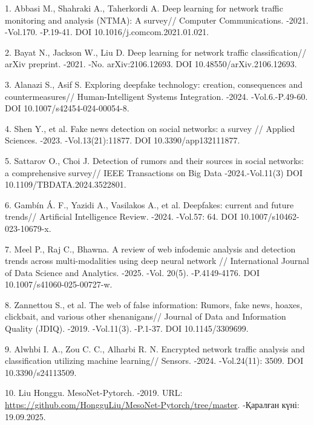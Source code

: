 \begin{refs}
1. Abbasi M., Shahraki A., Taherkordi A. Deep learning for network
traffic monitoring and analysis (NTMA): A survey// Computer
Communications. -2021. -Vol.170. -P.19-41. DOI
10.1016/j.comcom.2021.01.021.

2. Bayat N., Jackson W., Liu D. Deep learning for network traffic
classification// arXiv preprint. -2021. -No. arXiv:2106.12693. DOI
10.48550/arXiv.2106.12693.

3. Alanazi S., Asif S. Exploring deepfake technology: creation,
consequences and countermeasures// Human-Intelligent Systems
Integration. -2024. -Vol.6.-P.49-60. DOI 10.1007/s42454-024-00054-8.

4. Shen Y., et al. Fake news detection on social networks: a survey //
Applied Sciences. -2023. -Vol.13(21):11877. DOI 10.3390/app132111877.

5. Sattarov O., Choi J. Detection of rumors and their sources in social
networks: a comprehensive survey// IEEE Transactions on Big Data
-2024.-Vol.11(3) DOI 10.1109/TBDATA.2024.3522801.

6. Gambín Á. F., Yazidi A., Vasilakos A., et al. Deepfakes: current and
future trends// Artificial Intelligence Review. -2024. -Vol.57: 64.
DOI 10.1007/s10462-023-10679-x.

7. Meel P., Raj C., Bhawna. A review of web infodemic analysis and
detection trends across multi-modalities using deep neural network //
International Journal of Data Science and Analytics. -2025. -Vol.
20(5). -P.4149-4176. DOI 10.1007/s41060-025-00727-w.

8. Zannettou S., et al. The web of false information: Rumors, fake news,
hoaxes, clickbait, and various other shenanigans// Journal of Data and
Information Quality (JDIQ). -2019. -Vol.11(3). -P.1-37. DOI
10.1145/3309699.

9. Alwhbi I. A., Zou C. C., Alharbi R. N. Encrypted network traffic
analysis and classification utilizing machine learning// Sensors.
-2024. -Vol.24(11): 3509. DOI 10.3390/s24113509.

10. Liu Honggu. MesoNet-Pytorch. -2019. URL:
\url{https://github.com/HongguLiu/MesoNet-Pytorch/tree/master}.
-Қаралған күні: 19.09.2025.
\end{refs}

